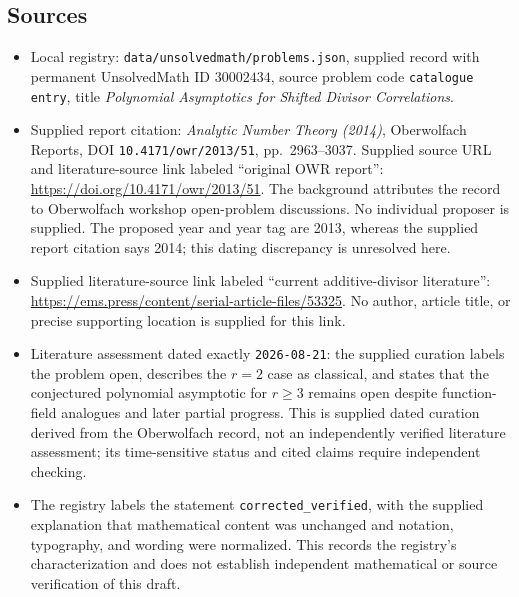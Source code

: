\documentclass[11pt]{article}
\begin{document}
\subsection{Sources}
\begin{itemize}
\item Local registry: \texttt{data/unsolvedmath/problems.json}, supplied record with permanent UnsolvedMath ID \(30002434\), source problem code \texttt{catalogue entry}, title \emph{Polynomial Asymptotics for Shifted Divisor Correlations}.
\item Supplied report citation: \emph{Analytic Number Theory (2014)}, Oberwolfach Reports, DOI \texttt{10.4171/owr/2013/51}, pp.~2963--3037. Supplied source URL and literature-source link labeled ``original OWR report'': \url{https://doi.org/10.4171/owr/2013/51}. The background attributes the record to Oberwolfach workshop open-problem discussions. No individual proposer is supplied. The proposed year and year tag are 2013, whereas the supplied report citation says 2014; this dating discrepancy is unresolved here.
\item Supplied literature-source link labeled ``current additive-divisor literature'': \url{https://ems.press/content/serial-article-files/53325}. No author, article title, or precise supporting location is supplied for this link.
\item Literature assessment dated exactly \texttt{2026-08-21}: the supplied curation labels the problem open, describes the \(r=2\) case as classical, and states that the conjectured polynomial asymptotic for \(r\geq3\) remains open despite function-field analogues and later partial progress. This is supplied dated curation derived from the Oberwolfach record, not an independently verified literature assessment; its time-sensitive status and cited claims require independent checking.
\item The registry labels the statement \texttt{corrected\_verified}, with the supplied explanation that mathematical content was unchanged and notation, typography, and wording were normalized. This records the registry's characterization and does not establish independent mathematical or source verification of this draft.
\end{itemize}
\end{document}
